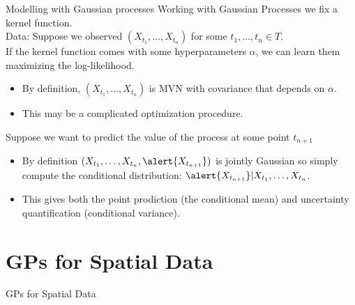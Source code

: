 \documentclass[11pt,handout,aspectratio=169]{beamer}
\begin{document}
\begin{frame}{Modelling with Gaussian processes}
Working with Gaussian Processes we 	fix a kernel function.\\[3mm]

Data: Suppose we observed $(X_{t_1},\ldots,X_{t_n})$ for some $t_1,\ldots,t_n\in T$. \\[3mm]
If the kernel function comes with some hyperparameters $\alpha$, we can learn them maximizing the log-likelihood.
	\begin{itemize}
	\item By definition, $(X_{t_1},\ldots,X_{t_n})$ is MVN with covariance that depends on $\alpha$. 
	\item This may be a complicated optimization procedure.\\[3mm]
	\end{itemize}

Suppose we want to predict the value of the process at some point $t_{n+1}$
	\begin{itemize}
	\item By definition  $(X_{t_1},\ldots,X_{t_n},\alert{X_{t_{n+1}}})$ is jointly Gaussian so simply compute the conditional distribution: $\alert{X_{t_{n+1}}}|X_{t_1},\ldots, X_{t_n}$.
	\item This gives both the point prodiction (the conditional mean) and uncertainty quantification (conditional variance).
\end{itemize}	
\end{frame}


\section{GPs for Spatial Data}

\begin{frame}{}
	\begin{center}
		{\Huge \alert{GPs for Spatial Data}}
	\end{center}
\end{frame}
\end{document}

